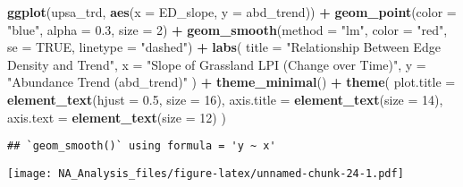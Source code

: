 \documentclass[
]{article}
\newenvironment{Shaded}{\begin{snugshade}}{\end{snugshade}}
\newcommand{\AttributeTok}[1]{\textcolor[rgb]{0.13,0.29,0.53}{#1}}
\newcommand{\ConstantTok}[1]{\textcolor[rgb]{0.56,0.35,0.01}{#1}}
\newcommand{\DecValTok}[1]{\textcolor[rgb]{0.00,0.00,0.81}{#1}}
\newcommand{\FloatTok}[1]{\textcolor[rgb]{0.00,0.00,0.81}{#1}}
\newcommand{\FunctionTok}[1]{\textcolor[rgb]{0.13,0.29,0.53}{\textbf{#1}}}
\newcommand{\NormalTok}[1]{#1}
\newcommand{\SpecialCharTok}[1]{\textcolor[rgb]{0.81,0.36,0.00}{\textbf{#1}}}
\newcommand{\StringTok}[1]{\textcolor[rgb]{0.31,0.60,0.02}{#1}}
\begin{document}
\begin{Shaded}
\begin{Highlighting}[]
\FunctionTok{ggplot}\NormalTok{(upsa\_trd, }\FunctionTok{aes}\NormalTok{(}\AttributeTok{x =}\NormalTok{ ED\_slope, }\AttributeTok{y =}\NormalTok{ abd\_trend)) }\SpecialCharTok{+}
  \FunctionTok{geom\_point}\NormalTok{(}\AttributeTok{color =} \StringTok{"blue"}\NormalTok{, }\AttributeTok{alpha =} \FloatTok{0.3}\NormalTok{, }\AttributeTok{size =} \DecValTok{2}\NormalTok{) }\SpecialCharTok{+}  
  \FunctionTok{geom\_smooth}\NormalTok{(}\AttributeTok{method =} \StringTok{"lm"}\NormalTok{, }\AttributeTok{color =} \StringTok{"red"}\NormalTok{, }\AttributeTok{se =} \ConstantTok{TRUE}\NormalTok{, }\AttributeTok{linetype =} \StringTok{"dashed"}\NormalTok{) }\SpecialCharTok{+} 
  \FunctionTok{labs}\NormalTok{(}
    \AttributeTok{title =} \StringTok{"Relationship Between Edge Density and Trend"}\NormalTok{,}
    \AttributeTok{x =} \StringTok{"Slope of Grassland LPI (Change over Time)"}\NormalTok{,}
    \AttributeTok{y =} \StringTok{"Abundance Trend (abd\_trend)"}
\NormalTok{  ) }\SpecialCharTok{+}
  \FunctionTok{theme\_minimal}\NormalTok{() }\SpecialCharTok{+}
  \FunctionTok{theme}\NormalTok{(}
    \AttributeTok{plot.title =} \FunctionTok{element\_text}\NormalTok{(}\AttributeTok{hjust =} \FloatTok{0.5}\NormalTok{, }\AttributeTok{size =} \DecValTok{16}\NormalTok{),}
    \AttributeTok{axis.title =} \FunctionTok{element\_text}\NormalTok{(}\AttributeTok{size =} \DecValTok{14}\NormalTok{),}
    \AttributeTok{axis.text =} \FunctionTok{element\_text}\NormalTok{(}\AttributeTok{size =} \DecValTok{12}\NormalTok{)}
\NormalTok{  )}
\end{Highlighting}
\end{Shaded}

\begin{verbatim}
## `geom_smooth()` using formula = 'y ~ x'
\end{verbatim}

\texttt{[image: NA\_Analysis\_files/figure-latex/unnamed-chunk-24-1.pdf]}
\end{document}
